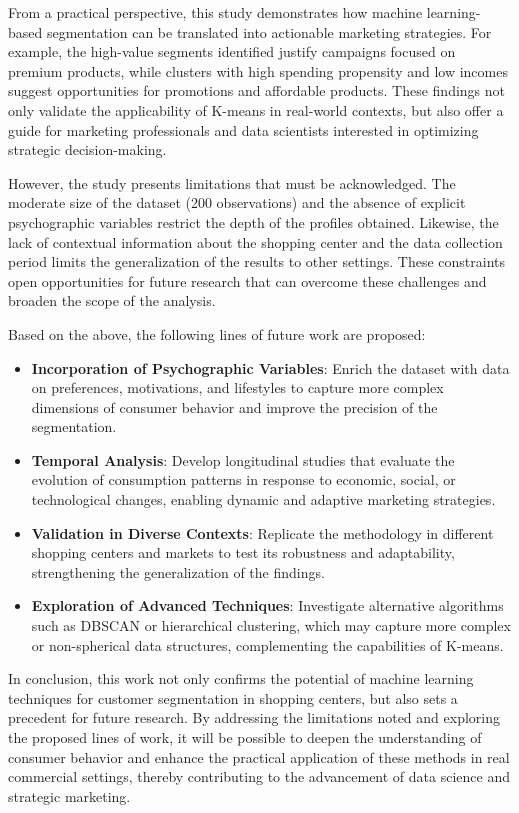 \documentclass[10pt]{article}
\begin{document}
From a practical perspective, this study demonstrates how machine learning-based segmentation can be translated into actionable marketing strategies. For example, the high-value segments identified justify campaigns focused on premium products, while clusters with high spending propensity and low incomes suggest opportunities for promotions and affordable products. These findings not only validate the applicability of K-means in real-world contexts, but also offer a guide for marketing professionals and data scientists interested in optimizing strategic decision-making.

However, the study presents limitations that must be acknowledged. The moderate size of the dataset (200 observations) and the absence of explicit psychographic variables restrict the depth of the profiles obtained. Likewise, the lack of contextual information about the shopping center and the data collection period limits the generalization of the results to other settings. These constraints open opportunities for future research that can overcome these challenges and broaden the scope of the analysis.

Based on the above, the following lines of future work are proposed:

\begin{itemize}
    \item \textbf{Incorporation of Psychographic Variables}: Enrich the dataset with data on preferences, motivations, and lifestyles to capture more complex dimensions of consumer behavior and improve the precision of the segmentation.
    \item \textbf{Temporal Analysis}: Develop longitudinal studies that evaluate the evolution of consumption patterns in response to economic, social, or technological changes, enabling dynamic and adaptive marketing strategies.
    \item \textbf{Validation in Diverse Contexts}: Replicate the methodology in different shopping centers and markets to test its robustness and adaptability, strengthening the generalization of the findings.
    \item \textbf{Exploration of Advanced Techniques}: Investigate alternative algorithms such as DBSCAN or hierarchical clustering, which may capture more complex or non-spherical data structures, complementing the capabilities of K-means.
\end{itemize}

In conclusion, this work not only confirms the potential of machine learning techniques for customer segmentation in shopping centers, but also sets a precedent for future research. By addressing the limitations noted and exploring the proposed lines of work, it will be possible to deepen the understanding of consumer behavior and enhance the practical application of these methods in real commercial settings, thereby contributing to the advancement of data science and strategic marketing.
\end{document}
